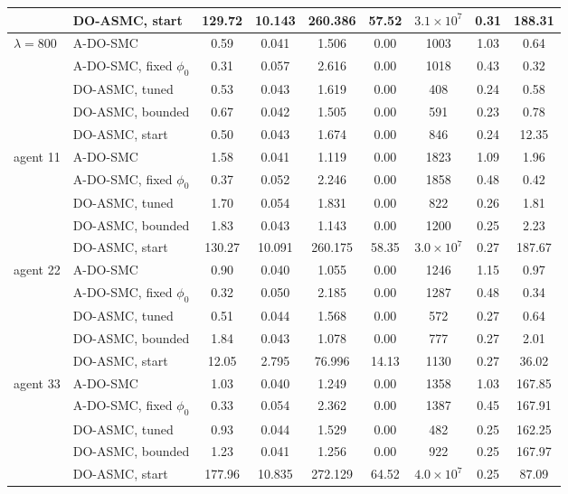 \begin{table}[t]
\begin{tabular}{@{}llccccccc@{}}
 & DO-ASMC, start & 129.72 & 10.143 & 260.386 & 57.52 & $3.1{\times}10^{7}$ & 0.31 & 188.31\\
\midrule
$\lambda=800$ & A-DO-SMC & 0.59 & 0.041 & 1.506 & 0.00 & 1003 & 1.03 & 0.64\\
 & A-DO-SMC, fixed $\phi_0$ & 0.31 & 0.057 & 2.616 & 0.00 & 1018 & 0.43 & 0.32\\
 & DO-ASMC, tuned & 0.53 & 0.043 & 1.619 & 0.00 & 408 & 0.24 & 0.58\\
 & DO-ASMC, bounded & 0.67 & 0.042 & 1.505 & 0.00 & 591 & 0.23 & 0.78\\
 & DO-ASMC, start & 0.50 & 0.043 & 1.674 & 0.00 & 846 & 0.24 & 12.35\\
\midrule
agent 11 & A-DO-SMC & 1.58 & 0.041 & 1.119 & 0.00 & 1823 & 1.09 & 1.96\\
 & A-DO-SMC, fixed $\phi_0$ & 0.37 & 0.052 & 2.246 & 0.00 & 1858 & 0.48 & 0.42\\
 & DO-ASMC, tuned & 1.70 & 0.054 & 1.831 & 0.00 & 822 & 0.26 & 1.81\\
 & DO-ASMC, bounded & 1.83 & 0.043 & 1.143 & 0.00 & 1200 & 0.25 & 2.23\\
 & DO-ASMC, start & 130.27 & 10.091 & 260.175 & 58.35 & $3.0{\times}10^{7}$ & 0.27 & 187.67\\
\midrule
agent 22 & A-DO-SMC & 0.90 & 0.040 & 1.055 & 0.00 & 1246 & 1.15 & 0.97\\
 & A-DO-SMC, fixed $\phi_0$ & 0.32 & 0.050 & 2.185 & 0.00 & 1287 & 0.48 & 0.34\\
 & DO-ASMC, tuned & 0.51 & 0.044 & 1.568 & 0.00 & 572 & 0.27 & 0.64\\
 & DO-ASMC, bounded & 1.84 & 0.043 & 1.078 & 0.00 & 777 & 0.27 & 2.01\\
 & DO-ASMC, start & 12.05 & 2.795 & 76.996 & 14.13 & 1130 & 0.27 & 36.02\\
\midrule
agent 33 & A-DO-SMC & 1.03 & 0.040 & 1.249 & 0.00 & 1358 & 1.03 & 167.85\\
 & A-DO-SMC, fixed $\phi_0$ & 0.33 & 0.054 & 2.362 & 0.00 & 1387 & 0.45 & 167.91\\
 & DO-ASMC, tuned & 0.93 & 0.044 & 1.529 & 0.00 & 482 & 0.25 & 162.25\\
 & DO-ASMC, bounded & 1.23 & 0.041 & 1.256 & 0.00 & 922 & 0.25 & 167.97\\
 & DO-ASMC, start & 177.96 & 10.835 & 272.129 & 64.52 & $4.0{\times}10^{7}$ & 0.25 & 87.09\\
\bottomrule
\end{tabular}
\end{table}
